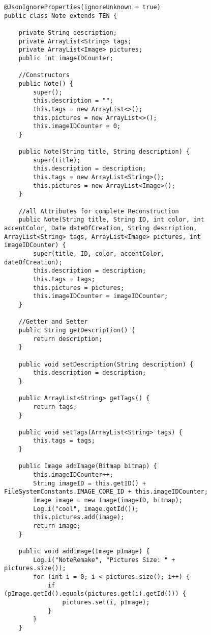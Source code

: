 \begin{figure}[H]
\begin{lstlisting}[caption=Note (Joscha Nassenstein)]
@JsonIgnoreProperties(ignoreUnknown = true)
public class Note extends TEN {

    private String description;
    private ArrayList<String> tags;
    private ArrayList<Image> pictures;
    public int imageIDCounter;

    //Constructors
    public Note() {
        super();
        this.description = "";
        this.tags = new ArrayList<>();
        this.pictures = new ArrayList<>();
        this.imageIDCounter = 0;
    }

    public Note(String title, String description) {
        super(title);
        this.description = description;
        this.tags = new ArrayList<String>();
        this.pictures = new ArrayList<Image>();
    }

    //all Attributes for complete Reconstruction
    public Note(String title, String ID, int color, int accentColor, Date dateOfCreation, String description, ArrayList<String> tags, ArrayList<Image> pictures, int imageIDCounter) {
        super(title, ID, color, accentColor, dateOfCreation);
        this.description = description;
        this.tags = tags;
        this.pictures = pictures;
        this.imageIDCounter = imageIDCounter;
    }

    //Getter and Setter
    public String getDescription() {
        return description;
    }

    public void setDescription(String description) {
        this.description = description;
    }

    public ArrayList<String> getTags() {
        return tags;
    }

    public void setTags(ArrayList<String> tags) {
        this.tags = tags;
    }

    public Image addImage(Bitmap bitmap) {
        this.imageIDCounter++;
        String imageID = this.getID() + FileSystemConstants.IMAGE_CORE_ID + this.imageIDCounter;
        Image image = new Image(imageID, bitmap);
        Log.i("cool", image.getId());
        this.pictures.add(image);
        return image;
    }

    public void addImage(Image pImage) {
        Log.i("NoteRemake", "Pictures Size: " + pictures.size());
        for (int i = 0; i < pictures.size(); i++) {
            if (pImage.getId().equals(pictures.get(i).getId())) {
                pictures.set(i, pImage);
            }
        }
    }


\end{lstlisting}
\end{figure}
